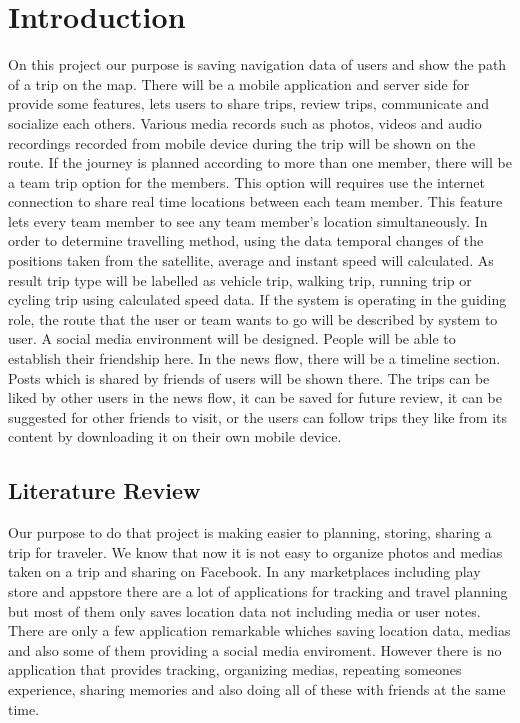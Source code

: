 \chapter{Introduction}
On this project our purpose is saving navigation data of users and show the path of a trip on the map. There will be a mobile application and server side for provide some features, lets users to share trips, review trips, communicate and socialize each others. Various media records such as photos, videos and audio recordings recorded from mobile device during the trip will be shown on the route. If the journey is planned according to more than one member, there will be a team trip option for the members. This option will requires use the internet connection to share real time locations between each team member. This feature lets every team member to see any team member's location simultaneously. In order to determine travelling method, using the data temporal changes of the positions taken from the satellite, average and instant speed will calculated. As result trip type will be labelled as vehicle trip, walking trip, running trip or cycling trip using calculated speed data. If the system is operating in the guiding role, the route that the user or team wants to go will be described by system to user. A social media environment will be designed. People will be able to establish their friendship here. In the news flow, there will be a timeline section. Posts which is shared by friends of users will be shown there. The trips can be liked by other users in the news flow, it can be saved for future review, it can be suggested for other friends to visit, or the users can follow trips they like from its content by downloading it on their own mobile device.
\section{Literature Review}
Our purpose to do that project is making easier to planning, storing, sharing a trip for traveler. We know that now it is not easy to organize photos and medias taken on a trip and sharing on Facebook. In any marketplaces including play store and appstore there are a lot of applications for tracking and travel planning but most of them only saves location data not including media or user notes. There are only a few application remarkable whiches saving location data, medias and also some of them providing a social media enviroment. However there is no application that provides tracking, organizing medias, repeating someones experience, sharing memories and also doing all of these with friends at the same time. 

